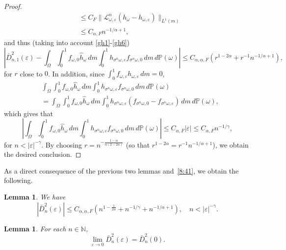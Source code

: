 \documentclass[12pt,reqno,a4paper]{article}
\newtheorem{lemma}[theorem]{Lemma}
\begin{document}
\begin{proof}
\begin{equation}
\begin{split}
			&\le C_F \|\mathcal L_{\omega, \varepsilon}^n (h_\omega-h_{\omega, \varepsilon})\|_{L^1(m)} \\
			&\le C_{\alpha, F} n^{-1/\alpha+1}, 
		\end{split}
	\end{equation} and thus (taking into account \eqref{gh1}-\eqref{gh6})
	\[
	\left |\bar D_{n, 1}^2(\varepsilon)-\int_\Omega \int_0^1 f_{\omega, 0}\hat h_\omega \, dm \int_0^1 h_{\sigma^n \omega, \varepsilon} f_{\sigma^n \omega, 0}\, dm \, d\mathbb P(\omega)\right | \le C_{\alpha, \underline{\alpha}, F} (r^{1-2\alpha}+r^{-1}n^{-1/\alpha+1}),
	\]
	for $r$ close to $0$. In addition, since $\int_0^1 f_{\omega, \varepsilon}h_{\omega, \varepsilon}\, dm=0$,
	\[
	\begin{split}
		& \int_\Omega \int_0^1 f_{\omega, 0}\hat h_\omega \, dm \int_0^1 h_{\sigma^n \omega, \varepsilon} f_{\sigma^n \omega, 0}\, dm \, d\mathbb P(\omega)\\
		&=\int_\Omega \int_0^1 f_{\omega, 0}\hat h_\omega \, dm \int_0^1 h_{\sigma^n \omega, \varepsilon} (f_{\sigma^n \omega, 0}-f_{\sigma^n \omega, \varepsilon})\, dm \, d\mathbb P(\omega),
	\end{split}
	\]
	which gives that
	\[
	\left |\int_\Omega \int_0^1 f_{\omega, 0}\hat h_\omega \, dm \int_0^1 h_{\sigma^n \omega, \varepsilon} f_{\sigma^n \omega, 0}\, dm \, d\mathbb P(\omega)\right | \le C_{\alpha, 
		F}|\varepsilon| \le C_{\alpha, F}n^{-1/\gamma},
	\]
	for $n<|\varepsilon|^{-\gamma}$. By choosing $r=n^{-\frac{1-\alpha}{\alpha (2-2\alpha)}}$ (so that $r^{1-2\alpha}=r^{-1}n^{-1/\alpha+1}$), we obtain the desired conclusion. %
\end{proof}
As a direct consequence of the previous two lemmas and~\eqref{8:41}, we obtain the following.
\begin{lemma}\label{summability1}
	We have
	\[
	|\bar{D}_n^2(\varepsilon)| \le C_{\alpha, \underline{\alpha}, F} (n^{1-\frac{1}{2\alpha}}+n^{-1/\gamma}+n^{-1/\alpha+1}), \quad n<|\varepsilon|^{-\gamma}.
	\]
\end{lemma}

\begin{lemma}\label{limitexists1}
	For each $n\in \mathbb N$,
	\[
	\lim_{\varepsilon \to 0}\bar D_n^2(\varepsilon)=\bar D_n^2(0).
	\]
\end{lemma}
\end{document}

